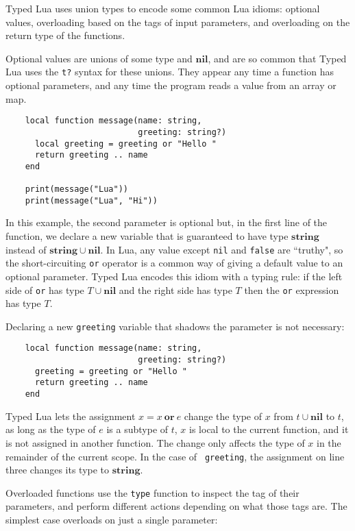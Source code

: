 \documentclass{sig-alternate}
\newcommand{\Nil}{\mathbf{nil}}
\newcommand{\String}{\mathbf{string}}
\begin{document}
Typed Lua uses union types to encode some common Lua idioms:
optional values, overloading based on the tags of input parameters,
and overloading on the return type of the functions.

Optional values are unions of some type and $\Nil$, and are so
common that Typed Lua uses the {\tt t?} syntax for these unions.
They appear any time a function has optional parameters, and
any time the program reads a value from an array or map.

\begin{verbatim}
    local function message(name: string,
                           greeting: string?)
      local greeting = greeting or "Hello "
      return greeting .. name
    end
    
    print(message("Lua"))
    print(message("Lua", "Hi"))
\end{verbatim}

In this example, the second parameter is optional but, in the
first line of the function, we declare a new variable that is
guaranteed to have type $\String$ instead of $\String \cup \Nil$.
In Lua, any value except {\tt nil} and {\tt false} are ``truthy",
so the short-circuiting {\tt or} operator is a common way of
giving a default value to an optional parameter. Typed Lua
encodes this idiom with a typing rule: if
the left side of {\tt or} has type $T \cup \Nil$ and the right side has type $T$ then the {\tt or} expression has type $T$.

Declaring a new {\tt greeting} variable that shadows the
parameter is not necessary:

\begin{verbatim}
    local function message(name: string, 
                           greeting: string?)
      greeting = greeting or "Hello "
      return greeting .. name
    end
\end{verbatim}

Typed Lua lets the assignment $x = x \ \mathbf{or} \ e$ change
the type of $x$ from $t \cup \Nil$ to $t$,
as long as the type of $e$ is a subtype of $t$, $x$ is local
to the current function, and it is not assigned in
another function. The change only affects the type of $x$
in the remainder of the current scope. In the case of {\tt
greeting}, the assignment on line three changes its type to
$\String$.

Overloaded functions use the {\tt type} function to inspect
the tag of their parameters, and perform different actions
depending on what those tags are. The simplest case overloads
on just a single parameter:
\end{document}
